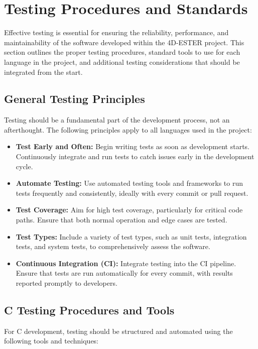 \documentclass{ol-softwaremanual}
\begin{document}
\section{Testing Procedures and Standards}

Effective testing is essential for ensuring the reliability, performance, and maintainability of the software developed within the 4D-ESTER project. This section outlines the proper testing procedures, standard tools to use for each language in the project, and additional testing considerations that should be integrated from the start.

\subsection{General Testing Principles}

Testing should be a fundamental part of the development process, not an afterthought. The following principles apply to all languages used in the project:

\begin{itemize}
    \item \textbf{Test Early and Often:} Begin writing tests as soon as development starts. Continuously integrate and run tests to catch issues early in the development cycle.
    \item \textbf{Automate Testing:} Use automated testing tools and frameworks to run tests frequently and consistently, ideally with every commit or pull request.
    \item \textbf{Test Coverage:} Aim for high test coverage, particularly for critical code paths. Ensure that both normal operation and edge cases are tested.
    \item \textbf{Test Types:} Include a variety of test types, such as unit tests, integration tests, and system tests, to comprehensively assess the software.
    \item \textbf{Continuous Integration (CI):} Integrate testing into the CI pipeline. Ensure that tests are run automatically for every commit, with results reported promptly to developers.
\end{itemize}

\subsection{C Testing Procedures and Tools}

For C development, testing should be structured and automated using the following tools and techniques:
\end{document}
